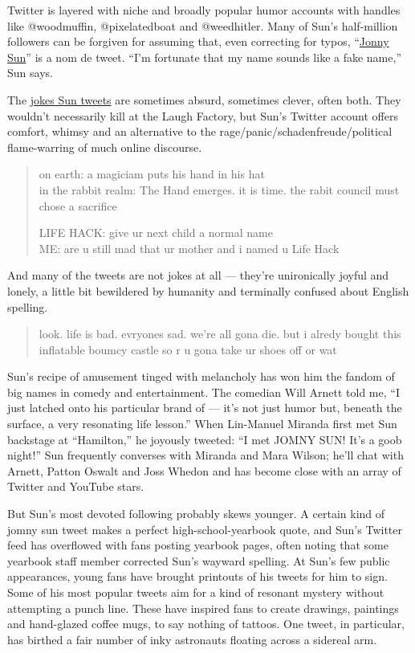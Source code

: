 Twitter is layered with niche and broadly popular humor accounts with
handles like @woodmuffin, @pixelatedboat and @weedhitler. Many of Sun's
half-million followers can be forgiven for assuming that, even
correcting for typos, ``\href{https://twitter.com/jonnysun}{Jonny Sun}''
is a nom de tweet. ``I'm fortunate that my name sounds like a fake
name,'' Sun says.

The \href{https://www.jomnysun.com/}{jokes Sun tweets} are sometimes
absurd, sometimes clever, often both. They wouldn't necessarily kill at
the Laugh Factory, but Sun's Twitter account offers comfort, whimsy and
an alternative to the rage/panic/schadenfreude/political flame-warring
of much online discourse.

\begin{quote}
on earth: a magiciam puts his hand in his hat\\
in the rabbit realm: The Hand emerges. it is time. the rabit council
must chose a sacrifice

LIFE HACK: give ur next child a normal name\\
ME: are u still mad that ur mother and i named u Life Hack
\end{quote}

And many of the tweets are not jokes at all --- they're unironically
joyful and lonely, a little bit bewildered by humanity and terminally
confused about English spelling.

\begin{quote}
look. life is bad. evryones sad. we're all gona die. but i alredy bought
this inflatable boumcy castle so r u gona take ur shoes off or wat
\end{quote}

Sun's recipe of amusement tinged with melancholy has won him the fandom
of big names in comedy and entertainment. The comedian Will Arnett told
me, ``I just latched onto his particular brand of --- it's not just
humor but, beneath the surface, a very resonating life lesson.'' When
Lin-Manuel Miranda first met Sun backstage at ``Hamilton,'' he joyously
tweeted: ``I met JOMNY SUN! It's a goob night!'' Sun frequently
converses with Miranda and Mara Wilson; he'll chat with Arnett, Patton
Oswalt and Joss Whedon and has become close with an array of Twitter and
YouTube stars.

But Sun's most devoted following probably skews younger. A certain kind
of jomny sun tweet makes a perfect high-school-yearbook quote, and Sun's
Twitter feed has overflowed with fans posting yearbook pages, often
noting that some yearbook staff member corrected Sun's wayward spelling.
At Sun's few public appearances, young fans have brought printouts of
his tweets for him to sign. Some of his most popular tweets aim for a
kind of resonant mystery without attempting a punch line. These have
inspired fans to create drawings, paintings and hand-glazed coffee mugs,
to say nothing of tattoos. One tweet, in particular, has birthed a fair
number of inky astronauts floating across a sidereal arm.

